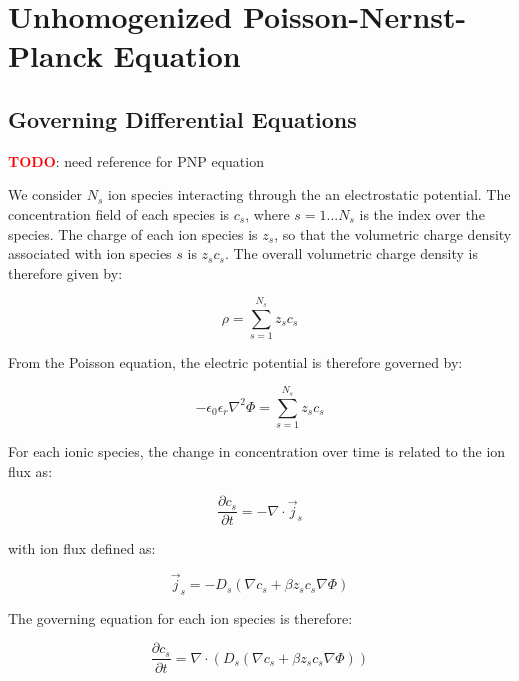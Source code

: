 
\section{Unhomogenized Poisson-Nernst-Planck Equation}\label{sec:unhom_pnp}

\subsection{Governing Differential Equations}\label{subsec:unhom_pnp_gov}


\textcolor{red}{\textbf{TODO}}: need reference for PNP equation

We consider $N_s$ ion species interacting through the an electrostatic potential.
The concentration field of each species is $c_s$, where $s=1 ... N_s$ is the index over the species.
The charge of each ion species is $z_s$, so that the volumetric charge density associated
with ion species $s$ is $z_s c_s$.
The overall volumetric charge density is therefore given by:

\begin{equation}
  \rho = \sum_{s=1}^{N_s}z_s c_s
\end{equation}

From the Poisson equation, the electric potential is therefore governed by:

\begin{equation}\label{eq:Poisson_for_ions}
  \boxed{
    -\epsilon_{0}\epsilon_{r} \nabla^2 \Phi = \sum_{s=1}^{N_s}z_s c_s
  }
\end{equation}

For each ionic species, the change in concentration over time is related to the ion flux as:

\begin{equation}
  \frac{\partial c_s}{\partial t} = - \nabla \cdot \vec{j}_s
\end{equation} 

with ion flux defined as:

\begin{equation}
  \vec{j}_s  = -D_s \left( \nabla c_s + \beta z_s c_s \nabla \Phi \right)
\end{equation}

The governing equation for each ion species is therefore:

\begin{equation}
  \frac{\partial c_s}{\partial t} = \nabla \cdot \left(
  D_s \left( \nabla c_s + \beta z_s c_s \nabla \Phi \right)
  \right)
\end{equation}

